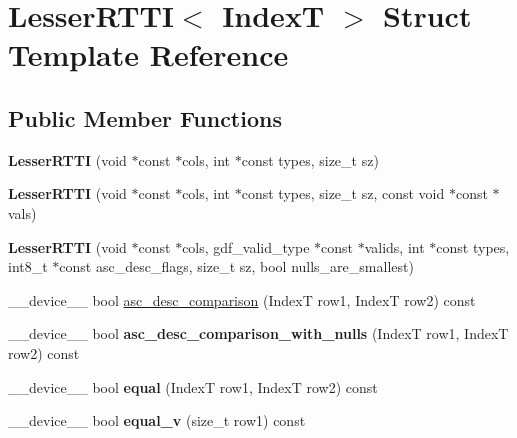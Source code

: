 \hypertarget{structLesserRTTI}{}\section{Lesser\+R\+T\+TI$<$ IndexT $>$ Struct Template Reference}
\label{structLesserRTTI}
\subsection*{Public Member Functions}
\begin{DoxyCompactItemize}
\item 
{\bfseries Lesser\+R\+T\+TI} (void $\ast$const $\ast$cols, int $\ast$const types, size\+\_\+t sz)\hypertarget{structLesserRTTI_a6da0e234922473ba38789fd58c6895b4}{}\label{structLesserRTTI_a6da0e234922473ba38789fd58c6895b4}

\item 
{\bfseries Lesser\+R\+T\+TI} (void $\ast$const $\ast$cols, int $\ast$const types, size\+\_\+t sz, const void $\ast$const $\ast$vals)\hypertarget{structLesserRTTI_ac8e0dc0c40eb5a88d364c84d2abde27a}{}\label{structLesserRTTI_ac8e0dc0c40eb5a88d364c84d2abde27a}

\item 
{\bfseries Lesser\+R\+T\+TI} (void $\ast$const $\ast$cols, gdf\+\_\+valid\+\_\+type $\ast$const $\ast$valids, int $\ast$const types, int8\+\_\+t $\ast$const asc\+\_\+desc\+\_\+flags, size\+\_\+t sz, bool nulls\+\_\+are\+\_\+smallest)\hypertarget{structLesserRTTI_a44d88703c5186d2951e98f9844fe4b52}{}\label{structLesserRTTI_a44d88703c5186d2951e98f9844fe4b52}

\item 
\+\_\+\+\_\+device\+\_\+\+\_\+ bool \hyperlink{structLesserRTTI_a34e8e07ea72ebf620d33bad90b0c0989}{asc\+\_\+desc\+\_\+comparison} (IndexT row1, IndexT row2) const 
\item 
\+\_\+\+\_\+device\+\_\+\+\_\+ bool {\bfseries asc\+\_\+desc\+\_\+comparison\+\_\+with\+\_\+nulls} (IndexT row1, IndexT row2) const \hypertarget{structLesserRTTI_a38c146b3433fa0e26c08d6b923c115a1}{}\label{structLesserRTTI_a38c146b3433fa0e26c08d6b923c115a1}

\item 
\+\_\+\+\_\+device\+\_\+\+\_\+ bool {\bfseries equal} (IndexT row1, IndexT row2) const \hypertarget{structLesserRTTI_a1aa23d8db3e3df40e762f6987a0d0457}{}\label{structLesserRTTI_a1aa23d8db3e3df40e762f6987a0d0457}

\item 
\+\_\+\+\_\+device\+\_\+\+\_\+ bool {\bfseries equal\+\_\+v} (size\+\_\+t row1) const \hypertarget{structLesserRTTI_a61bb75edc204e6c7d9b078fb8879116e}{}\label{structLesserRTTI_a61bb75edc204e6c7d9b078fb8879116e}


\end{DoxyCompactItemize}
